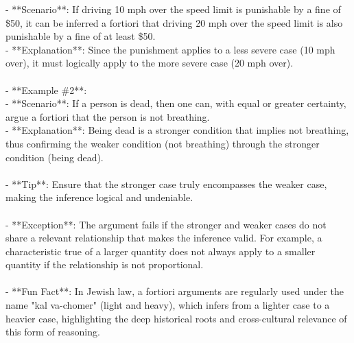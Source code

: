 \documentclass[a4paper,12pt,single,pdftex]{scrbook}
\begin{document}
{    
        - **Scenario**: If driving 10 mph over the speed limit is punishable by a fine of \$50, it can be inferred a fortiori that driving 20 mph over the speed limit is also punishable by a fine of at least \$50.
    \\

    
        - **Explanation**: Since the punishment applies to a less severe case (10 mph over), it must logically apply to the more severe case (20 mph over).
    \\

    
      
    \\

    
      - **Example \#2**:
    \\

    
        - **Scenario**: If a person is dead, then one can, with equal or greater certainty, argue a fortiori that the person is not breathing.
    \\

    
        - **Explanation**: Being dead is a stronger condition that implies not breathing, thus confirming the weaker condition (not breathing) through the stronger condition (being dead).
    \\

    
      
    \\

    
      - **Tip**: Ensure that the stronger case truly encompasses the weaker case, making the inference logical and undeniable.
    \\

    
      
    \\

    
      - **Exception**: The argument fails if the stronger and weaker cases do not share a relevant relationship that makes the inference valid. For example, a characteristic true of a larger quantity does not always apply to a smaller quantity if the relationship is not proportional.
    \\

    
      
    \\

    
      - **Fun Fact**: In Jewish law, a fortiori arguments are regularly used under the name "kal va-chomer" (light and heavy), which infers from a lighter case to a heavier case, highlighting the deep historical roots and cross-cultural relevance of this form of reasoning.
    \\

  }
\end{document}
